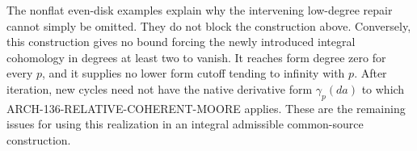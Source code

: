 The nonflat even-disk examples explain why the intervening
low-degree repair cannot simply be omitted. They do not block
the construction above. Conversely, this construction gives
no bound forcing the newly introduced integral cohomology in
degrees at least two to vanish. It reaches form degree zero
for every \(p\), and it supplies no lower form cutoff tending
to infinity with \(p\). After iteration, new cycles need not
have the native derivative form \(\gamma_p(da)\) to which
ARCH-136-RELATIVE-COHERENT-MOORE applies. These are the remaining
issues for using this realization in an integral admissible
common-source construction.
